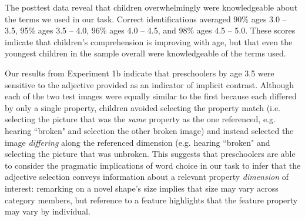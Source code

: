 \documentclass[10pt,letterpaper]{article}
\begin{document}

The posttest data reveal that children overwhelmingly were  knowledgeable about the terms we used in our task.  Correct identifications averaged 90\% ages 3.0 -- 3.5, 95\% ages 3.5 -- 4.0, 96\% ages 4.0 -- 4.5, and 98\% ages 4.5 -- 5.0.  These scores indicate that children's comprehension is improving with age, but that even the youngest children in the sample overall were knowledgeable of the terms used. 





Our results from Experiment 1b indicate that preschoolers by age 3.5 were sensitive to the adjective provided as an indicator of implicit contrast.  Although each of the two test images were equally similar to the first because each differed by only a single property, children avoided selecting the property match (i.e. selecting the picture that was the \emph{same} property as the one referenced, e.g. hearing ``broken" and selection the other broken image) and instead selected the image \emph{differing} along the referenced dimension (e.g. hearing ``broken" and selecting the picture that was unbroken. This suggests that preschoolers are able to consider the pragmatic implications of word choice in our task to infer that the adjective selection conveys information about a relevant property \emph{dimension} of interest: remarking on a novel shape's size implies that size may vary across category members, but reference to a feature highlights that the feature property may vary by individual.  
\end{document}
